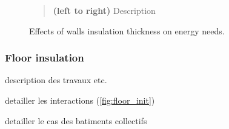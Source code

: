 \documentclass[11pt]{article}
\begin{document}
\begin{figure}[ht]
                \caption{\label{fig:walls_init} Effects of walls insulation thickness on energy needs.}
                \begin{quote}
                    \vspace{-2mm}
                    \small\noindent
                    \textbf{(left to right)} Description
                  \end{quote}
            \end{figure}
        

        \subsubsection{Floor insulation} %
        \label{ssub:floor_insulation}

        description des travaux etc.

        detailler les interactions (\ref{fig:floor_init})

        detailler le cas des batiments collectifs 
\end{document}

